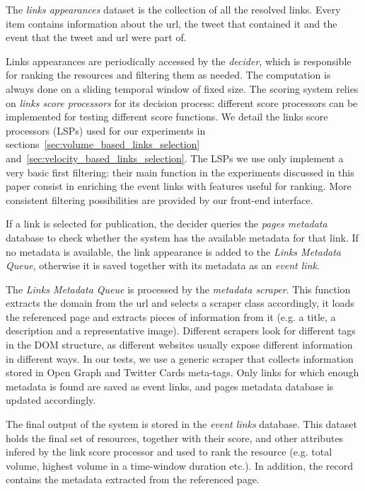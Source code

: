 \documentclass{sig-alternate}
\begin{document}
The \emph{links appearances} dataset is the collection of all the resolved links. Every item contains information about the url, the tweet that contained it and the event that the tweet and url were part of. %

Links appearances are periodically accessed by the \emph{decider}, which is responsible for ranking the resources and filtering them as needed. The computation is always done on a sliding temporal window of fixed size. The scoring system relies on \emph{links score processors} for its decision process: different score processors can be implemented for testing different score functions. We detail the links score processors (LSPs) used for our experiments in sections~\ref{sec:volume_based_links_selection} and~\ref{sec:velocity_based_links_selection}. The LSPs we use only implement a very basic first filtering: their main function in the experiments discussed in this paper consist in enriching the event links with features useful for ranking. More consistent filtering possibilities are provided by our front-end interface.

If a link is selected for publication, the decider queries the \emph{pages metadata} database to check whether the system has the available metadata for that link. If no metadata is available, the link appearance is added to the \emph{Links Metadata Queue}, otherwise it is saved together with its metadata as an \emph{event link}.

The \emph{Links Metadata Queue} is processed by the \emph{metadata scraper}. This function extracts the domain from the url and selects a scraper class accordingly, it loads the referenced page and extracts pieces of information from it (e.g. a title, a description and a representative image). Different scrapers look for different tags in the DOM structure, as different websites usually expose different information in different ways. In our tests, we use a generic scraper that collects information stored in Open Graph and Twitter Cards meta-tags. Only links for which enough metadata is found are saved as event links, and pages metadata database is updated accordingly. %

The final output of the system is stored in the \emph{event links} database. This dataset holds the final set of resources, together with their score, and other attributes infered by the link score processor and used to rank the resource (e.g. total volume, highest volume in a time-window duration etc.). In addition, the record contains the metadata extracted from the referenced page. %
\end{document}
